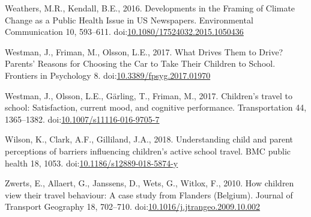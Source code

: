 \documentclass[]{elsarticle} %
\begin{document}
\leavevmode\hypertarget{ref-weathersDevelopmentsFramingClimate2016}{}%
Weathers, M.R., Kendall, B.E., 2016. Developments in the Framing of
Climate Change as a Public Health Issue in US Newspapers. Environmental
Communication 10, 593--611.
doi:\href{https://doi.org/10.1080/17524032.2015.1050436}{10.1080/17524032.2015.1050436}

\leavevmode\hypertarget{ref-westmanWhatDrivesThem2017}{}%
Westman, J., Friman, M., Olsson, L.E., 2017. What Drives Them to
Drive?Parents' Reasons for Choosing the Car to Take Their Children to
School. Frontiers in Psychology 8.
doi:\href{https://doi.org/10.3389/fpsyg.2017.01970}{10.3389/fpsyg.2017.01970}

\leavevmode\hypertarget{ref-westmanChildrenTravelSchool2017}{}%
Westman, J., Olsson, L.E., Gärling, T., Friman, M., 2017. Children's
travel to school: Satisfaction, current mood, and cognitive performance.
Transportation 44, 1365--1382.
doi:\href{https://doi.org/10.1007/s11116-016-9705-7}{10.1007/s11116-016-9705-7}

\leavevmode\hypertarget{ref-wilsonUnderstandingChildParent2018}{}%
Wilson, K., Clark, A.F., Gilliland, J.A., 2018. Understanding child and
parent perceptions of barriers influencing children's active school
travel. BMC public health 18, 1053.
doi:\href{https://doi.org/10.1186/s12889-018-5874-y}{10.1186/s12889-018-5874-y}

\leavevmode\hypertarget{ref-zwertsHowChildrenView2010}{}%
Zwerts, E., Allaert, G., Janssens, D., Wets, G., Witlox, F., 2010. How
children view their travel behaviour: A case study from Flanders
(Belgium). Journal of Transport Geography 18, 702--710.
doi:\href{https://doi.org/10.1016/j.jtrangeo.2009.10.002}{10.1016/j.jtrangeo.2009.10.002}
\end{document}
